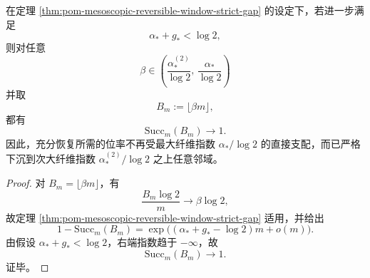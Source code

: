 \begin{corollary}[最大层总质量指数可忽略时的充分恢复位率下沉]\label{cor:pom-sufficient-recovery-rate-sinks-below-maxfiber}
在定理 \ref{thm:pom-mesoscopic-reversible-window-strict-gap} 的设定下，若进一步满足
\[
\alpha_\ast+g_\ast<\log 2,
\]
则对任意
\[
\beta\in\left(\frac{\alpha_\ast^{(2)}}{\log 2},\,\frac{\alpha_\ast}{\log 2}\right)
\]
并取
\[
B_m:=\lfloor \beta m\rfloor,
\]
都有
\[
\mathrm{Succ}_m(B_m)\longrightarrow 1.
\]
因此，充分恢复所需的位率不再受最大纤维指数 \(\alpha_\ast/\log 2\) 的直接支配，而已严格下沉到次大纤维指数 \(\alpha_\ast^{(2)}/\log 2\) 之上任意邻域。
\end{corollary}
\begin{proof}
对 \(B_m=\lfloor \beta m\rfloor\)，有
\[
\frac{B_m\log 2}{m}\longrightarrow \beta\log 2,
\]
故定理 \ref{thm:pom-mesoscopic-reversible-window-strict-gap} 适用，并给出
\[
1-\mathrm{Succ}_m(B_m)
=
\exp\!\bigl((\alpha_\ast+g_\ast-\log 2)m+o(m)\bigr).
\]
由假设 \(\alpha_\ast+g_\ast<\log 2\)，右端指数趋于 \(-\infty\)，故
\[
\mathrm{Succ}_m(B_m)\longrightarrow 1.
\]
证毕。
\end{proof}

\endinput
